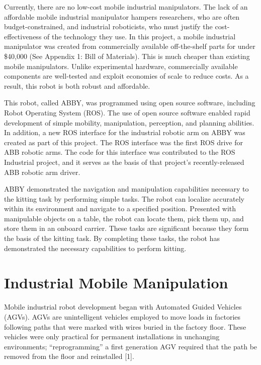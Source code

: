 \documentclass[]{cwru} %
\begin{document}
Currently, there are no low-cost mobile industrial manipulators. The
lack of an affordable mobile industrial manipulator hampers researchers,
who are often budget-constrained, and industrial roboticists, who must
justify the cost-effectiveness of the technology they use. In this
project, a mobile industrial manipulator was created from commercially
available off-the-shelf parts for under \$40,000 (See Appendix 1: Bill
of Materials). This is much cheaper than existing mobile manipulators.
Unlike experimental hardware, commercially available components are
well-tested and exploit economies of scale to reduce costs. As a result,
this robot is both robust and affordable.

This robot, called ABBY, was programmed using open source software,
including Robot Operating System (ROS). The use of open source software
enabled rapid development of simple mobility, manipulation, perception,
and planning abilities. In addition, a new ROS interface for the
industrial robotic arm on ABBY was created as part of this project. The
ROS interface was the first ROS drive for ABB robotic arms. The code for
this interface was contributed to the ROS Industrial project, and it
serves as the basis of that project's recently-released ABB robotic arm
driver.

ABBY demonstrated the navigation and manipulation capabilities necessary
to the kitting task by performing simple tasks. The robot can localize
accurately within its environment and navigate to a specified position.
Presented with manipulable objects on a table, the robot can locate
them, pick them up, and store them in an onboard carrier. These tasks
are significant because they form the basis of the kitting task. By
completing these tasks, the robot has demonstrated the necessary
capabilities to perform kitting.

\chapter{Industrial Mobile Manipulation}

Mobile industrial robot development began with Automated Guided Vehicles
(AGVs). AGVs are unintelligent vehicles employed to move loads in
factories following paths that were marked with wires buried in the
factory floor. These vehicles were only practical for permanent
installations in unchanging environments; ``reprogramming'' a first
generation AGV required that the path be removed from the floor and
reinstalled {[}1{]}.
\end{document}
